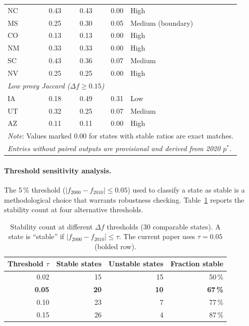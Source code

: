 \begin{table}[h]
\begin{tabular}{l r r r l}
NC  & 0.43 & 0.43 & 0.00 & High \\
MS  & 0.25 & 0.30 & 0.05 & Medium (boundary) \\
CO  & 0.13 & 0.13 & 0.00 & High \\
NM  & 0.33 & 0.33 & 0.00 & High \\
SC  & 0.43 & 0.36 & 0.07 & Medium \\
NV  & 0.25 & 0.25 & 0.00 & High \\
\midrule
\multicolumn{5}{l}{\textit{Low proxy Jaccard ($\Delta f \geq 0.15$)}} \\
IA  & 0.18 & 0.49 & 0.31 & Low \\
UT  & 0.32 & 0.25 & 0.07 & Medium \\
AZ  & 0.11 & 0.11 & 0.00 & High \\
\bottomrule
\multicolumn{5}{l}{\textit{Note}: Values marked 0.00 for states with stable ratios are exact matches.} \\
\multicolumn{5}{l}{\textit{Entries without paired outputs are provisional and derived from 2020 $p^*$.}} \\
\end{tabular}
\end{table}

\paragraph{Threshold sensitivity analysis.}
The 5\,\% threshold ($|f_{2000} - f_{2010}| \leq 0.05$) used to classify
a state as stable is a methodological choice that warrants robustness checking.
Table~\ref{tab:threshold-sensitivity} reports the stability count at four
alternative thresholds.

\begin{table}[h]
\centering
\caption{Stability count at different $\Delta f$ thresholds (30 comparable states).
  A state is ``stable'' if $|f_{2000} - f_{2010}| \leq \tau$.
  The current paper uses $\tau = 0.05$ (bolded row).}
\label{tab:threshold-sensitivity}
\small
\begin{tabular}{r r r r}
\toprule
Threshold $\tau$ & Stable states & Unstable states & Fraction stable \\
\midrule
0.02 & 15 & 15 & 50\,\% \\
\textbf{0.05} & \textbf{20} & \textbf{10} & \textbf{67\,\%} \\
0.10 & 23 & 7  & 77\,\% \\
0.15 & 26 & 4  & 87\,\% \\
\bottomrule
\end{tabular}
\end{table}

